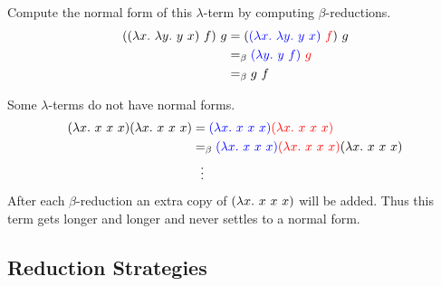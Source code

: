 \documentclass{book}
\begin{document}
    \begin{eg}{}
        Compute the normal form of this $\lambda$-term by computing $\beta$-reductions. 
        \begin{align*}
            ((\lambda x. \ \lambda y. \ y \ x) \ f) \ g &= (\textcolor{blue}{(\lambda x. \ \lambda y. \ y \ x)} \textcolor{red}{ \ f}) \ g \\
            &=_{\beta} \textcolor{blue}{(\lambda y. \ y \ f)} \textcolor{red}{ \ g} \\
            &=_{\beta} g \ f
        \end{align*}
    \end{eg}

    \begin{eg}{}
        Some $\lambda$-terms do not have normal forms. 
        \begin{align*}
            (\lterm{x}{x \ x \ x})(\lterm{x}{x \ x \ x}) &= \lamabsarg{(\lterm{x}{x \ x \ x})}{(\lterm{x}{x \ x \ x})} \\
            &\beq \lamabsarg{(\lterm{x}{x \ x \ x})}{(\lterm{x}{x \ x \ x})} (\lterm{x}{x \ x \ x})\\
            & \ \ \vdots
        \end{align*}
        After each $\beta$-reduction an extra copy of $(\lterm{x}{x \ x \ x})$ will be added. Thus this term gets longer and longer and never settles to a normal form. 
    \end{eg}

    \subsection*{Reduction Strategies}
\end{document}
